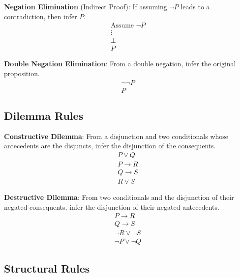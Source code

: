 \begin{definition}
\textbf{Negation Elimination} (Indirect Proof): If assuming $\neg P$ leads to a
contradiction, then infer $P$.
\[
\begin{array}{l}
\text{Assume } \neg P \\ \vdots \\ \bot \\ \hline
P
\end{array}
\]
\end{definition}

\begin{definition}
\textbf{Double Negation Elimination}: From a double negation, infer the original
proposition.
\[
\begin{array}{l}
\neg\neg P \\ \hline
P
\end{array}
\]
\end{definition}

\subsection{Dilemma Rules}

\begin{definition}
\textbf{Constructive Dilemma}: From a disjunction and two conditionals whose
antecedents are the disjuncts, infer the disjunction of the consequents.
\[
\begin{array}{l}
P \vee Q \\
P \rightarrow R \\
Q \rightarrow S \\ \hline
R \vee S
\end{array}
\]
\end{definition}

\begin{definition}
\textbf{Destructive Dilemma}: From two conditionals and the disjunction of their
negated consequents, infer the disjunction of their negated antecedents.
\[
\begin{array}{l}
P \rightarrow R \\
Q \rightarrow S \\
\neg R \vee \neg S \\ \hline
\neg P \vee \neg Q
\end{array}
\]
\end{definition}

\subsection{Structural Rules}

